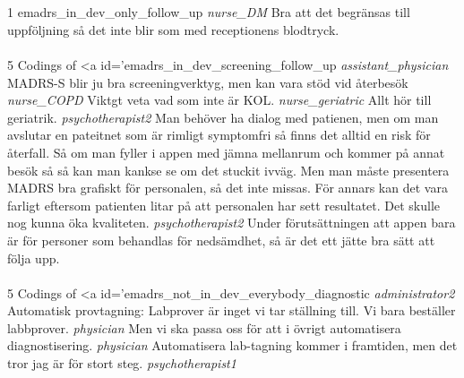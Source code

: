 \documentclass[12pt,a4paper,oneside]{article}
\begin{document}
\\
\\
1 
emadrs\_in\_dev\_only\_follow\_up %
 {\it nurse\_DM %
 } 
Bra att det begränsas till uppföljning så det inte blir som med receptionens blodtryck. %
\\
\\
5 Codings of <a id='emadrs\_in\_dev\_screening\_follow\_up %
 {\it assistant\_physician %
 } 
MADRS-S blir ju bra screeningverktyg, men kan vara stöd vid återbesök %
 {\it nurse\_COPD %
 } 
Viktgt veta vad som inte är KOL. %
 {\it nurse\_geriatric %
 } 
Allt hör till geriatrik.  %
 {\it psychotherapist2 %
 } 
Man behöver ha dialog med patienen, men om man avslutar en pateitnet som är rimligt symptomfri så finns det alltid en risk för återfall. Så om man fyller i appen med jämna mellanrum och kommer på annat besök så så kan man kankse se om det stuckit ivväg. Men man måste presentera MADRS bra grafiskt för personalen, så det inte missas. För annars kan det vara farligt eftersom patienten litar på att personalen har sett resultatet. Det skulle nog kunna öka kvaliteten.  %
 {\it psychotherapist2 %
 } 
Under förutsättningen att appen bara är för personer som behandlas för nedsämdhet, så är det ett jätte bra sätt att följa upp. %
\\
\\
5 Codings of <a id='emadrs\_not\_in\_dev\_everybody\_diagnostic %
 {\it administrator2 %
 } 
Automatisk provtagning: Labprover är inget vi tar ställning till. Vi bara beställer labbprover. %
 {\it physician %
 } 
Men vi ska passa oss för att i övrigt automatisera diagnostisering.  %
 {\it physician %
 } 
Automatisera lab-tagning kommer i framtiden, men det tror jag är för stort steg. %
 {\it psychotherapist1 %
 } 
\end{document}
